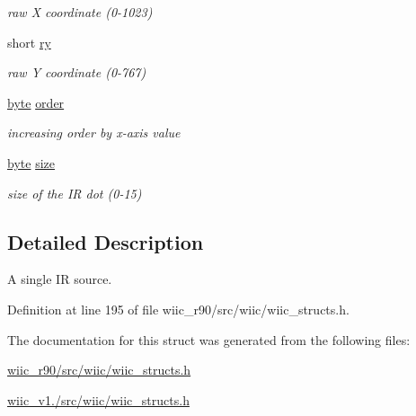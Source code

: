 \begin{DoxyCompactItemize}
\begin{DoxyCompactList}\small\item\em raw X coordinate (0-\/1023) \end{DoxyCompactList}\item 
\hypertarget{structir__dot__t_ab7fb2aacd27c03155935515907b49065}{short \hyperlink{structir__dot__t_ab7fb2aacd27c03155935515907b49065}{ry}}\label{structir__dot__t_ab7fb2aacd27c03155935515907b49065}

\begin{DoxyCompactList}\small\item\em raw Y coordinate (0-\/767) \end{DoxyCompactList}\item 
\hypertarget{structir__dot__t_a729a0f66a1b6ed5ec6caf999934ef44b}{\hyperlink{wiic__r90_2src_2wiic_2wiic__macros_8h_a0c8186d9b9b7880309c27230bbb5e69d}{byte} \hyperlink{structir__dot__t_a729a0f66a1b6ed5ec6caf999934ef44b}{order}}\label{structir__dot__t_a729a0f66a1b6ed5ec6caf999934ef44b}

\begin{DoxyCompactList}\small\item\em increasing order by x-\/axis value \end{DoxyCompactList}\item 
\hypertarget{structir__dot__t_a009422c74d8c2a1dcfe64e669cb7aa91}{\hyperlink{wiic__r90_2src_2wiic_2wiic__macros_8h_a0c8186d9b9b7880309c27230bbb5e69d}{byte} \hyperlink{structir__dot__t_a009422c74d8c2a1dcfe64e669cb7aa91}{size}}\label{structir__dot__t_a009422c74d8c2a1dcfe64e669cb7aa91}

\begin{DoxyCompactList}\small\item\em size of the I\-R dot (0-\/15) \end{DoxyCompactList}\end{DoxyCompactItemize}


\subsection{Detailed Description}
A single I\-R source. 

Definition at line 195 of file wiic\-\_\-r90/src/wiic/wiic\-\_\-structs.\-h.



The documentation for this struct was generated from the following files\-:\begin{DoxyCompactItemize}
\item 
\hyperlink{wiic__r90_2src_2wiic_2wiic__structs_8h}{wiic\-\_\-r90/src/wiic/wiic\-\_\-structs.\-h}\item 
\hyperlink{wiic__v1_81_2src_2wiic_2wiic__structs_8h}{wiic\-\_\-v1./src/wiic/wiic\-\_\-structs.\-h}\end{DoxyCompactItemize}
